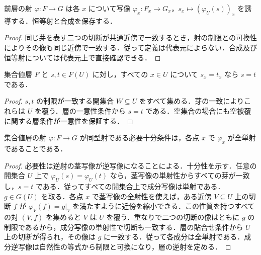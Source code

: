 \begin{prop}[前層の射の茎写像]
前層の射 $\varphi:F\to G$ は各 $x$ について写像 $\varphi_x:F_x\to G_x$，$s_x\mapsto(\varphi_U(s))_x$ を誘導する．恒等射と合成を保存する．
\end{prop}
\begin{proof}
同じ芽を表す二つの切断が共通近傍で一致するとき，射の制限との可換性によりその像も同じ近傍で一致する．従って定義は代表元によらない．合成及び恒等射については代表元上で直接確認できる．
\end{proof}
\begin{prop}[芽による切断の一致判定]
集合値層 $F$ と $s,t\in F(U)$ に対し，すべての $x\in U$ について $s_x=t_x$ なら $s=t$ である．
\end{prop}
\begin{proof}
$s,t$ の制限が一致する開集合 $W\subseteq U$ をすべて集める．芽の一致によりこれらは $U$ を覆う．層の一意性条件から $s=t$ である．空集合の場合にも空被覆に関する層条件が一意性を保証する．
\end{proof}
\begin{prop}[茎による層の同型判定]
集合値層の射 $\varphi:F\to G$ が同型射である必要十分条件は，各点 $x$ で $\varphi_x$ が全単射であることである．
\end{prop}
\begin{proof}
必要性は逆射の茎写像が逆写像になることによる．十分性を示す．任意の開集合 $U$ 上で $\varphi_U(s)=\varphi_U(t)$ なら，茎写像の単射性からすべての芽が一致し，$s=t$ である．従ってすべての開集合上で成分写像は単射である．$g\in G(U)$ を取る．各点 $x$ で茎写像の全射性を使えば，ある近傍 $V\subseteq U$ 上の切断 $f$ が $\varphi_V(f)=g|_V$ を満たすように近傍を縮小できる．この性質を持つすべての対 $(V,f)$ を集めると $V$ は $U$ を覆う．重なりで二つの切断の像はともに $g$ の制限であるから，成分写像の単射性で切断も一致する．層の貼合せ条件から $U$ 上の切断が得られ，その像は $g$ に一致する．従って各成分は全単射である．成分逆写像は自然性の等式から制限と可換になり，層の逆射を定める．
\end{proof}
